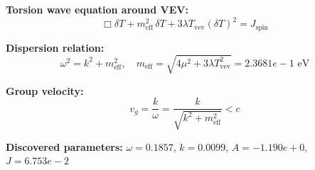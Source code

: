 
\textbf{Torsion wave equation around VEV:}
\begin{equation}
  \Box \delta T + m_{\text{eff}}^2 \, \delta T + 3\lambda T_{\text{vev}} (\delta T)^2 = J_{\text{spin}}
\end{equation}

\textbf{Dispersion relation:}
\begin{equation}
  \omega^2 = k^2 + m_{\text{eff}}^2, \quad
  m_{\text{eff}} = \sqrt{4\mu^2 + 3\lambda T_{\text{vev}}^2} = 2.3681e-1 \text{ eV}
\end{equation}

\textbf{Group velocity:}
\begin{equation}
  v_g = \frac{k}{\omega} = \frac{k}{\sqrt{k^2 + m_{\text{eff}}^2}} < c
\end{equation}

\textbf{Discovered parameters:}
$\omega = 0.1857$, \quad
$k = 0.0099$, \quad
$A = -1.190e+0$, \quad
$J = 6.753e-2$